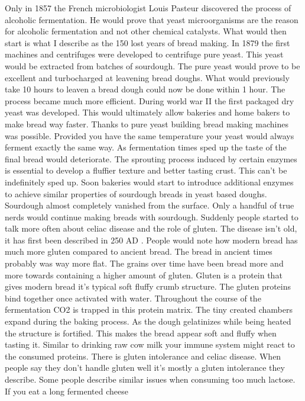 Only in 1857 the French microbiologist Louis Pasteur discovered
the process of alcoholic fermentation. He would prove that
yeast microorganisms are the reason for alcoholic fermentation
and not other chemical catalysts. What would then start is
what I describe as the 150 lost years of bread making. In 1879
the first machines and centrifuges were developed to centrifuge
pure yeast. This yeast would be extracted from batches of sourdough.
The pure yeast would prove to be excellent and turbocharged
at leavening bread doughs. What would previously take 10 hours
to leaven a bread dough could now be done within 1 hour.
The process became much more efficient. During world war II
the first packaged dry yeast was developed. This would ultimately
allow bakeries and home bakers to make bread way faster.
Thanks to pure yeast building bread making machines was
possible. Provided you have the same temperature your yeast
would always ferment exactly the same way. As fermentation
times sped up the taste of the final bread would deteriorate.
The sprouting process induced by certain enzymes is essential
to develop a fluffier texture and better tasting crust. This
can't be indefinitely sped up. Soon bakeries would start
to introduce additional enzymes to achieve similar properties
of sourdough breads in yeast based doughs. Sourdough almost
completely vanished from the surface. Only a handful
of true nerds would continue making breads with sourdough.
Suddenly people started to talk more often about celiac disease
and the role of gluten. The disease isn't old, it has first
been described in 250 AD \cite{coeliac+disease}. People
would note how modern bread has much more gluten compared
to ancient bread. The bread in ancient times probably was way more flat.
The grains over time have been bread more and more towards containing a higher
amount of gluten. Gluten is a protein that gives modern
bread it's typical soft fluffy crumb structure. The
gluten proteins bind together once activated with water.
Throughout the course of the fermentation CO2 is trapped
in this protein matrix. The tiny created chambers expand
during the baking process. As the dough gelatinizes while
being heated the structure is fortified. This makes the bread appear
soft and fluffy when tasting it. Similar to drinking
raw cow milk your immune system might react to
the consumed proteins. There is gluten intolerance
and celiac disease. When people say they don't handle
gluten well it's mostly a gluten intolerance they describe.
Some people describe similar issues when consuming
too much lactose. If you eat a long fermented cheese
